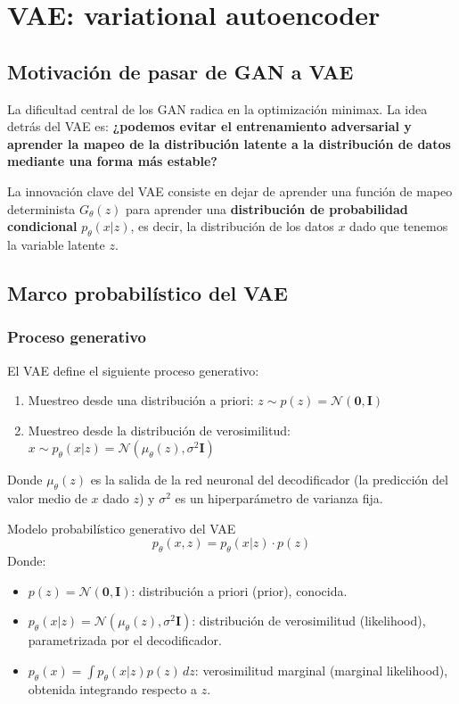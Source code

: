 \documentclass[a4paper]{article}
\begin{document}
\newpage
\section{VAE: variational autoencoder}

\subsection{Motivación de pasar de GAN a VAE}

La dificultad central de los GAN radica en la optimización minimax. La idea detrás del VAE es: \textbf{¿podemos evitar el entrenamiento adversarial y aprender la mapeo de la distribución latente a la distribución de datos mediante una forma más estable?}

La innovación clave del VAE consiste en dejar de aprender una función de mapeo determinista $G_\theta(z)$ para aprender una \textbf{distribución de probabilidad condicional} $p_\theta(x|z)$, es decir, la distribución de los datos $x$ dado que tenemos la variable latente $z$.

\subsection{Marco probabilístico del VAE}

\subsubsection{Proceso generativo}

El VAE define el siguiente proceso generativo:

\begin{enumerate}
    \item Muestreo desde una distribución a priori: $z \sim p(z) = \mathcal{N}(\mathbf{0}, \mathbf{I})$
    \item Muestreo desde la distribución de verosimilitud: $x \sim p_\theta(x|z) = \mathcal{N}(\mu_\theta(z), \sigma^2 \mathbf{I})$
\end{enumerate}

Donde $\mu_\theta(z)$ es la salida de la red neuronal del decodificador (la predicción del valor medio de $x$ dado $z$) y $\sigma^2$ es un hiperparámetro de varianza fija.

\begin{importantbox}{Modelo probabilístico generativo del VAE}
$$p_\theta(x, z) = p_\theta(x|z) \cdot p(z)$$
Donde:
\begin{itemize}
    \item $p(z) = \mathcal{N}(\mathbf{0}, \mathbf{I})$: distribución a priori (prior), conocida.
    \item $p_\theta(x|z) = \mathcal{N}(\mu_\theta(z), \sigma^2 \mathbf{I})$: distribución de verosimilitud (likelihood), parametrizada por el decodificador.
    \item $p_\theta(x) = \int p_\theta(x|z) p(z) \, dz$: verosimilitud marginal (marginal likelihood), obtenida integrando respecto a $z$.
\end{itemize}
\end{importantbox}
\end{document}
